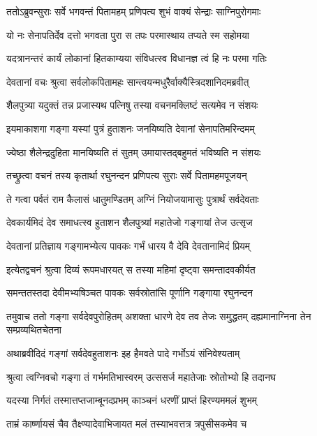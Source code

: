 \twolineshloka
{ततोऽब्रुवन्सुराः सर्वे भगवन्तं पितामहम्}
{प्रणिपत्य शुभं वाक्यं सेन्द्राः साग्निपुरोगमाः} %

\twolineshloka
{यो नः सेनापतिर्देव दत्तो भगवता पुरा}
{स तपः परमास्थाय तप्यते स्म सहोमया} %

\twolineshloka
{यदत्रानन्तरं कार्यं लोकानां हितकाम्यया}
{संविधत्स्व विधानज्ञ त्वं हि नः परमा गतिः} %

\twolineshloka
{देवतानां वचः श्रुत्वा सर्वलोकपितामहः}
{सान्त्वयन्मधुरैर्वाक्यैस्त्रिदशानिदमब्रवीत्} %

\twolineshloka
{शैलपुत्र्या यदुक्तं तन्न प्रजास्यथ पत्निषु}
{तस्या वचनमक्लिष्टं सत्यमेव न संशयः} %

\twolineshloka
{इयमाकाशगा गङ्गा यस्यां पुत्रं हुताशनः}
{जनयिष्यति देवानां सेनापतिमरिन्दमम्} %

\twolineshloka
{ज्येष्ठा शैलेन्द्रदुहिता मानयिष्यति तं सुतम्}
{उमायास्तद्बहुमतं भविष्यति न संशयः} %

\twolineshloka
{तच्छ्रुत्वा वचनं तस्य कृतार्था रघुनन्दन}
{प्रणिपत्य सुराः सर्वे पितामहमपूजयन्} %

\twolineshloka
{ते गत्वा पर्वतं राम कैलासं धातुमण्डितम्}
{अग्निं नियोजयामासुः पुत्रार्थं सर्वदेवताः} %

\twolineshloka
{देवकार्यमिदं देव समाधत्स्व हुताशन}
{शैलपुत्र्यां महातेजो गङ्गायां तेज उत्सृज} %

\twolineshloka
{देवतानां प्रतिज्ञाय गङ्गामभ्येत्य पावकः}
{गर्भं धारय वै देवि देवतानामिदं प्रियम्} %

\twolineshloka
{इत्येतद्वचनं श्रुत्वा दिव्यं रूपमधारयत्}
{स तस्या महिमां दृष्ट्वा समन्तादवकीर्यत} %

\twolineshloka
{समन्ततस्तदा देवीमभ्यषिञ्चत पावकः}
{सर्वस्रोतांसि पूर्णानि गङ्गाया रघुनन्दन} %

\threelineshloka
{तमुवाच ततो गङ्गा सर्वदेवपुरोहितम्}
{अशक्ता धारणे देव तव तेजः समुद्धतम्}
{दह्यमानाग्निना तेन सम्प्रव्यथितचेतना} %

\twolineshloka
{अथाब्रवीदिदं गङ्गां सर्वदेवहुताशनः}
{इह हैमवते पादे गर्भोऽयं संनिवेश्यताम्} %

\twolineshloka
{श्रुत्वा त्वग्निवचो गङ्गा तं गर्भमतिभास्वरम्}
{उत्ससर्ज महातेजाः स्रोतोभ्यो हि तदानघ} %

\twolineshloka
{यदस्या निर्गतं तस्मात्तप्तजाम्बूनदप्रभम्}
{काञ्चनं धरणीं प्राप्तं हिरण्यममलं शुभम्} %

\twolineshloka
{ताम्रं कार्ष्णायसं चैव तैक्ष्ण्यादेवाभिजायत}
{मलं तस्याभवत्तत्र त्रपुसीसकमेव च} %

